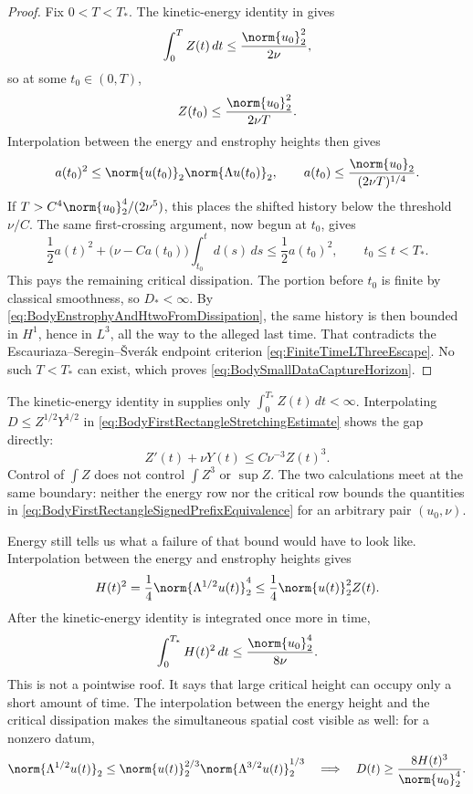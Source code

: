 \begin{proof}
Fix \(0<T<T_*\).  The kinetic-energy identity in
 gives
\[
  \int_0^T Z(t)\,dt
  \leq\frac{\norm{u_0}_2^2}{2\nu},
\]
so at some \(t_0\in(0,T)\),
\[
  Z(t_0)\leq\frac{\norm{u_0}_2^2}{2\nu T}.
\]
Interpolation between the energy and enstrophy heights then gives
\[
  a(t_0)^2
  \leq\norm{u(t_0)}_2\norm{\Lambda u(t_0)}_2,
  \qquad
  a(t_0)
  \leq\frac{\norm{u_0}_2}{(2\nu T)^{1/4}}.
\]
If \(T>C^4\norm{u_0}_2^4/(2\nu^5)\), this places the shifted history below
the threshold \(\nu/C\).  The same first-crossing argument, now begun at
\(t_0\), gives
\[
  \frac12a(t)^2
  +\bigl(\nu-Ca(t_0)\bigr)\int_{t_0}^t d(s)\,ds
  \leq\frac12a(t_0)^2,
  \qquad t_0\leq t<T_*.
\]
This pays the remaining critical dissipation.  The portion before \(t_0\) is
finite by classical smoothness, so \(D_*<\infty\).  By
\eqref{eq:BodyEnstrophyAndHtwoFromDissipation}, the same history is then
bounded in \(H^1\), hence in \(L^3\), all the way to the alleged last time.
That contradicts the Escauriaza--Seregin--\v{S}ver\'ak endpoint criterion
\eqref{eq:FiniteTimeLThreeEscape}.  No such \(T<T_*\) can exist, which proves
\eqref{eq:BodySmallDataCaptureHorizon}.
\end{proof}

The kinetic-energy identity in 
supplies only \(\int_0^{T_*}Z(t)\,dt<\infty\).  Interpolating
\(D\leq Z^{1/2}Y^{1/2}\) in
\eqref{eq:BodyFirstRectangleStretchingEstimate} shows the gap directly:
\begin{equation}\label{eq:BodyCubicEnstrophyObstruction}
  Z'(t)+\nu Y(t)
  \leq C\nu^{-3}Z(t)^3.
\end{equation}
Control of \(\int Z\) does not control \(\int Z^3\) or \(\sup Z\).  The two
calculations meet at the same boundary: neither the energy row nor the critical
row bounds the quantities in
\eqref{eq:BodyFirstRectangleSignedPrefixEquivalence} for an arbitrary pair
\((u_0,\nu)\).

Energy still tells us what a failure of that bound would have to look like.
Interpolation between the energy and enstrophy heights gives
\[
  H(t)^2
  =\frac14\norm{\Lambda^{1/2}u(t)}_2^4
  \leq\frac14\norm{u(t)}_2^2 Z(t).
\]
After the kinetic-energy identity is integrated once more in time,
\begin{equation}\label{eq:BodyCriticalHeightTimeOccupancy}
  \int_0^{T_*}H(t)^2\,dt
  \leq\frac{\norm{u_0}_2^4}{8\nu}.
\end{equation}
This is not a pointwise roof.  It says that large critical height can occupy
only a short amount of time.  The interpolation between the energy height and
the critical dissipation makes the simultaneous spatial cost visible as well:
for a nonzero datum,
\begin{equation}\label{eq:BodyCriticalDissipationLowerFromHeight}
  \norm{\Lambda^{1/2}u(t)}_2
  \leq
  \norm{u(t)}_2^{2/3}
  \norm{\Lambda^{3/2}u(t)}_2^{1/3}
  \quad\Longrightarrow\quad
  D(t)\geq\frac{8H(t)^3}{\norm{u_0}_2^4}.
\end{equation}

